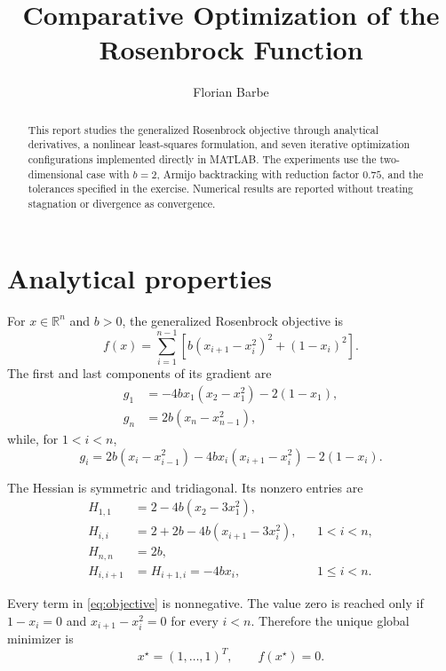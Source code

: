 \documentclass[a4paper,11pt]{article}
\title{Comparative Optimization of the Rosenbrock Function}
\author{Florian Barbe}
\date{}
\begin{document}
\maketitle

\begin{abstract}
This report studies the generalized Rosenbrock objective through analytical
derivatives, a nonlinear least-squares formulation, and seven iterative
optimization configurations implemented directly in MATLAB. The experiments
use the two-dimensional case with $b=2$, Armijo backtracking with reduction
factor $0.75$, and the tolerances specified in the exercise. Numerical results
are reported without treating stagnation or divergence as convergence.
\end{abstract}

\section{Analytical properties}

For $x\in\mathbb{R}^n$ and $b>0$, the generalized Rosenbrock objective is
\begin{equation}
 f(x)=\sum_{i=1}^{n-1}\left[b(x_{i+1}-x_i^2)^2+(1-x_i)^2\right].
 \label{eq:objective}
\end{equation}
The first and last components of its gradient are
\begin{align}
 g_1&=-4bx_1(x_2-x_1^2)-2(1-x_1),\\
 g_n&=2b(x_n-x_{n-1}^2),
\end{align}
while, for $1<i<n$,
\begin{equation}
 g_i=2b(x_i-x_{i-1}^2)-4bx_i(x_{i+1}-x_i^2)-2(1-x_i).
\end{equation}

The Hessian is symmetric and tridiagonal. Its nonzero entries are
\begin{align}
 H_{1,1}&=2-4b(x_2-3x_1^2),\\
 H_{i,i}&=2+2b-4b(x_{i+1}-3x_i^2), &&1<i<n,\\
 H_{n,n}&=2b,\\
 H_{i,i+1}&=H_{i+1,i}=-4bx_i, &&1\leq i<n.
\end{align}

Every term in \eqref{eq:objective} is nonnegative. The value zero is reached
only if $1-x_i=0$ and $x_{i+1}-x_i^2=0$ for every $i<n$. Therefore the unique
global minimizer is
\begin{equation}
 x^\star=(1,\ldots,1)^T,\qquad f(x^\star)=0.
\end{equation}
\end{document}
